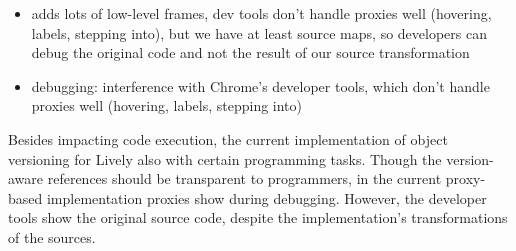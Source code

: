 
\begin{itemize}
    \item adds lots of low-level frames, dev tools don’t handle proxies well (hovering, labels, stepping into), but we have at least source maps, so developers can debug the original code and not the result of our source transformation
    \item debugging: interference with Chrome's developer tools, which don’t handle proxies well (hovering, labels, stepping into)
\end{itemize}


Besides impacting code execution, the current implementation of object versioning for Lively also  with certain programming tasks.
Though the version-aware references should be transparent to programmers, in the current proxy-based implementation proxies show during debugging.
However, the developer tools show the original source code, despite the implementation's transformations of the sources.
